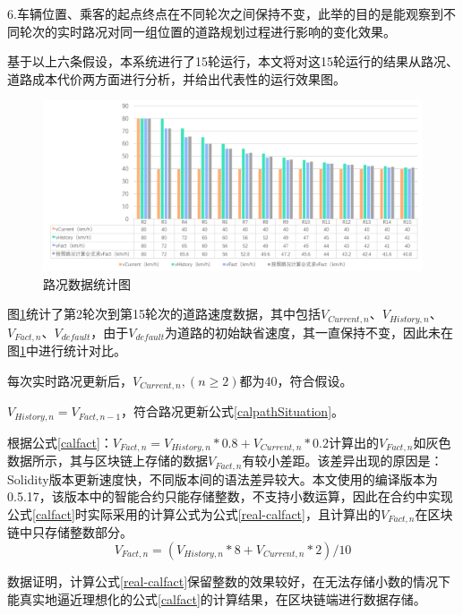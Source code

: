 6.车辆位置、乘客的起点终点在不同轮次之间保持不变，此举的目的是能观察到不同轮次的实时路况对同一组位置的道路规划过程进行影响的变化效果。

基于以上六条假设，本系统进行了15轮运行，本文将对这15轮运行的结果从路况、道路成本代价两方面进行分析，并给出代表性的运行效果图。

\begin{figure}[ht]
  \centering
  \includegraphics[width=1\textwidth]{undergraduate-thesis/images/PathSituationAnalysis.png}
  \caption{路况数据统计图}
  \label{nine-new-Taxi-path} %
\end{figure}

图\ref{nine-new-Taxi-path}统计了第2轮次到第15轮次的道路速度数据，其中包括$V_{Current,n}$、$V_{History,n}$、$V_{Fact,n}$、$V_{default}$，由于$V_{default}$为道路的初始缺省速度，其一直保持不变，因此未在图\ref{nine-new-Taxi-path}中进行统计对比。

每次实时路况更新后，$V_{Current,n},(n\ge 2)$都为40，符合假设。

$V_{History,n}=V_{Fact,n-1}$，符合路况更新公式\ref{calpathSituation}。

根据公式\ref{calfact}：$V_{Fact,n}=V_{History,n}*0.8+V_{Current,n}*0.2$计算出的$V_{Fact,n}$如灰色数据所示，其与区块链上存储的数据$V_{Fact,n}$有较小差距。该差异出现的原因是：Solidity版本更新速度快，不同版本间的语法差异较大。本文使用的编译版本为0.5.17，该版本中的智能合约只能存储整数，不支持小数运算，因此在合约中实现公式\ref{calfact}时实际采用的计算公式为公式\ref{real-calfact}，且计算出的$V_{Fact,n}$在区块链中只存储整数部分。
\begin{equation}
    V_{Fact,n}=(V_{History,n}*8+V_{Current,n}*2)/10
\label{real-calfact}
\end{equation}

数据证明，计算公式\ref{real-calfact}保留整数的效果较好，在无法存储小数的情况下能真实地逼近理想化的公式\ref{calfact}的计算结果，在区块链端进行数据存储。

